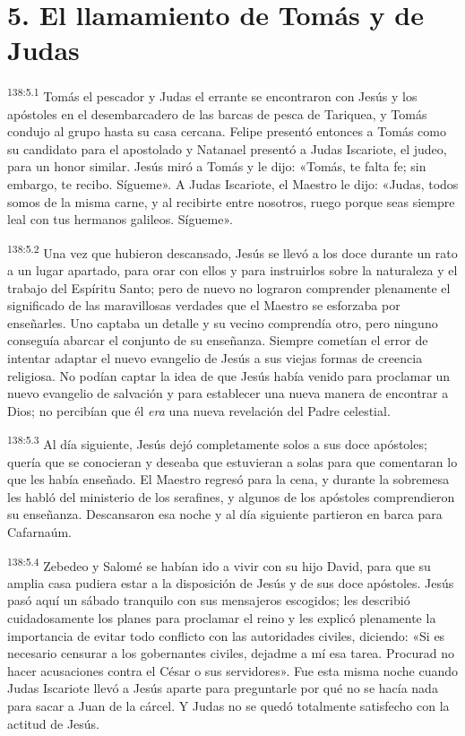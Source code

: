 \section*{5. El llamamiento de Tomás y de Judas}
\par
\textsuperscript{138:5.1} Tomás el pescador y Judas el errante se encontraron con Jesús y los apóstoles en el desembarcadero de las barcas de pesca de Tariquea, y Tomás condujo al grupo hasta su casa cercana. Felipe presentó entonces a Tomás como su candidato para el apostolado y Natanael presentó a Judas Iscariote, el judeo, para un honor similar. Jesús miró a Tomás y le dijo: «Tomás, te falta fe; sin embargo, te recibo. Sígueme». A Judas Iscariote, el Maestro le dijo: «Judas, todos somos de la misma carne, y al recibirte entre nosotros, ruego porque seas siempre leal con tus hermanos galileos. Sígueme».

\par
\textsuperscript{138:5.2} Una vez que hubieron descansado, Jesús se llevó a los doce durante un rato a un lugar apartado, para orar con ellos y para instruirlos sobre la naturaleza y el trabajo del Espíritu Santo; pero de nuevo no lograron comprender plenamente el significado de las maravillosas verdades que el Maestro se esforzaba por enseñarles. Uno captaba un detalle y su vecino comprendía otro, pero ninguno conseguía abarcar el conjunto de su enseñanza. Siempre cometían el error de intentar adaptar el nuevo evangelio de Jesús a sus viejas formas de creencia religiosa. No podían captar la idea de que Jesús había venido para proclamar un nuevo evangelio de salvación y para establecer una nueva manera de encontrar a Dios; no percibían que él \textit{era} una nueva revelación del Padre celestial.

\par
\textsuperscript{138:5.3} Al día siguiente, Jesús dejó completamente solos a sus doce apóstoles; quería que se conocieran y deseaba que estuvieran a solas para que comentaran lo que les había enseñado. El Maestro regresó para la cena, y durante la sobremesa les habló del ministerio de los serafines, y algunos de los apóstoles comprendieron su enseñanza. Descansaron esa noche y al día siguiente partieron en barca para Cafarnaúm.

\par
\textsuperscript{138:5.4} Zebedeo y Salomé se habían ido a vivir con su hijo David, para que su amplia casa pudiera estar a la disposición de Jesús y de sus doce apóstoles. Jesús pasó aquí un sábado tranquilo con sus mensajeros escogidos; les describió cuidadosamente los planes para proclamar el reino y les explicó plenamente la importancia de evitar todo conflicto con las autoridades civiles, diciendo: «Si es necesario censurar a los gobernantes civiles, dejadme a mí esa tarea. Procurad no hacer acusaciones contra el César o sus servidores». Fue esta misma noche cuando Judas Iscariote llevó a Jesús aparte para preguntarle por qué no se hacía nada para sacar a Juan de la cárcel. Y Judas no se quedó totalmente satisfecho con la actitud de Jesús.

